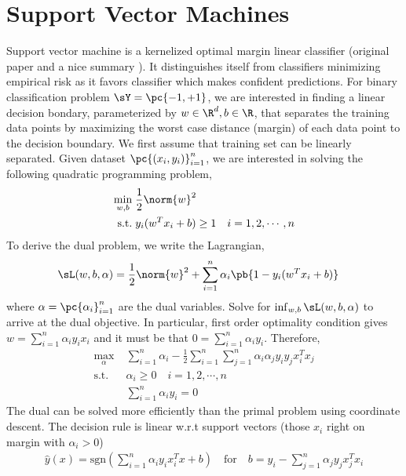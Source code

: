 \documentclass[11pt]{article}
\begin{document}
 
\section{Support Vector Machines}
 
Support vector machine is a kernelized optimal margin linear classifier (original paper \cite{boserTrainingAlgorithmOptimal1992} and a nice summary \cite{vertPrimerKernelMethods2004}). It distinguishes itself from classifiers minimizing empirical risk as it favors classifier which makes confident predictions. For binary classification problem $\sY=\pc{-1,+1}$, we are interested in finding a linear decision bondary, parameterized by $w\in\R^d,b\in\R$, that separates the training data points by maximizing the worst case distance (margin) of each data point to the decision boundary. We first assume that training set can be linearly separated. Given dataset $\pc{(x_i,y_i)}_{i=1}^n$, we are interested in solving the following quadratic programming problem,
\begin{align*}
    \min_{w,b}
        \;& \frac{1}{2} \norm{w}^2 \\
    \text{s.t.}
        \;& y_i(w^Tx_i + b) \geq 1 \quad i=1,2,\cdots,n
\end{align*}
To derive the dual problem, we write the Lagrangian, 
\begin{align}
    \sL(w,b,\alpha)
        &= \frac{1}{2} \norm{w}^2 + \sum_{i=1}^n \alpha_i \pb{ 1 - y_i(w^Tx_i+b) }
\end{align}
where $\alpha = \pc{\alpha_i}_{i=1}^n$ are the dual variables. Solve for $\inf_{w,b} \sL(w,b,\alpha)$ to arrive at the dual objective. In particular, first order optimality condition gives $w = \sum_{i=1}^n \alpha_i y_i x_i$ and it must be that $0=\sum_{i=1}^n \alpha_i y_i$. Therefore, 
\begin{align*}
    \max_{\alpha}
        \;& \sum_{i=1}^n \alpha_i - \frac{1}{2} \sum_{i=1}^n\sum_{j=1}^n \alpha_i \alpha_j y_i y_j x_i^Tx_j \\
    \text{s.t.}
        \;& \alpha_i \geq 0 \quad i=1,2,\cdots, n
            \tag{dual feasibility} \\
        & \sum_{i=1}^n \alpha_i y_i = 0 
            \tag{from $\nabla_b \sL = 0$}
\end{align*}
The dual can be solved more efficiently than the primal problem using coordinate descent. The decision rule is linear w.r.t support vectors (those $x_i$ right on margin with $\alpha_i > 0$)
\begin{align}
    \hat{y}(x) = \text{sgn}\left(
        \sum_{i=1}^n \alpha_i y_i x_i^T x + b
    \right)
    \quad\text{for}\quad
    b 
        = y_i - \sum_{j=1}^n \alpha_j y_j x_j^T x_i
\end{align}
\end{document}
